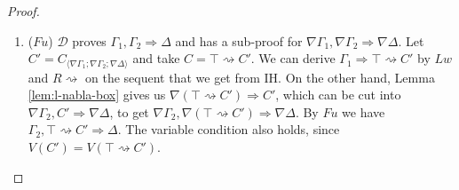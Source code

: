 \documentclass[12pt,a4paper]{article}
\theoremstyle{plain}
\theoremstyle{definition}
\begin{document}
\begin{proof}
\begin{enumerate}
	\item ($Fu$) $\mathcal{D}$ proves $\Gamma_1, \Gamma_2 \Rightarrow \Delta$ and has a sub-proof for $\nabla \Gamma_1, \nabla \Gamma_2 \Rightarrow \nabla \Delta$. Let $C' = C_{\langle\nabla\Gamma_1;\nabla\Gamma_2;\nabla\Delta\rangle}$ and take $C = \top \rightsquigarrow C'$. We can derive $\Gamma_1 \Rightarrow \top \rightsquigarrow C'$ by $Lw$ and $R\rightsquigarrow$ on the sequent that we get from IH. On the other hand, Lemma \ref{lem:l-nabla-box} gives us $\nabla (\top \rightsquigarrow C') \Rightarrow C'$, which can be cut into $\nabla \Gamma_2, C' \Rightarrow \nabla \Delta$, to get $\nabla \Gamma_2, \nabla (\top \rightsquigarrow C') \Rightarrow \nabla \Delta$. By $Fu$ we have $\Gamma_2, \top \rightsquigarrow C' \Rightarrow \Delta$. The variable condition also holds, since $V(C') = V(\top \rightsquigarrow C')$.
\end{enumerate}
\end{proof}
\end{document}
